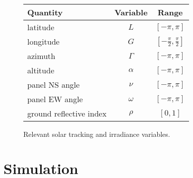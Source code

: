 \documentclass{article}
\begin{document}
{\renewcommand{\arraystretch}{1.2}%
\begin{figure}
\centering
\begin{tabular}{lcc}
\toprule
Quantity& Variable& Range \\
\midrule
latitude& $L$& $[-\pi, \pi]$ \\
longitude& $G$&  $\left[-\frac{\pi}{2}, \frac{\pi}{2}\right]$\\
azimuth& $\Gamma$& $[-\pi, \pi]$ \\
altitude& $\alpha$& $[-\pi, \pi]$ \\
panel NS angle& $\nu$& $[-\pi, \pi]$ \\
panel EW angle& $\omega$& $[-\pi, \pi]$ \\
ground reflective index& $\rho$& $[0,1]$ \\
\bottomrule
\end{tabular}
\caption{Relevant solar tracking and irradiance variables.}
\end{figure}

%

\section{Simulation}
\label{sec:simulation}

}
\end{document}

